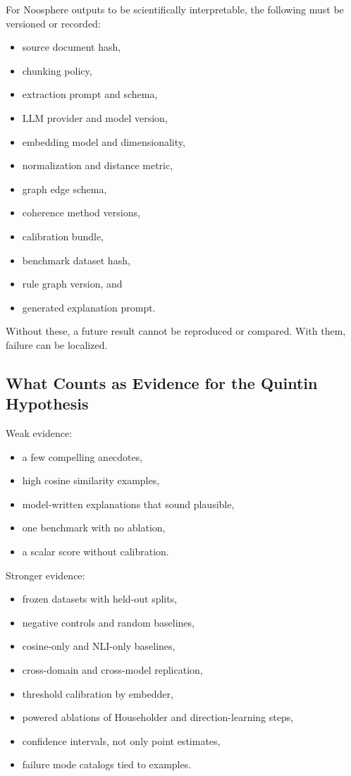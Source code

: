 \documentclass[11pt]{article}
\begin{document}
For Noosphere outputs to be scientifically interpretable, the following must be
versioned or recorded:

\begin{itemize}
\item source document hash,
\item chunking policy,
\item extraction prompt and schema,
\item LLM provider and model version,
\item embedding model and dimensionality,
\item normalization and distance metric,
\item graph edge schema,
\item coherence method versions,
\item calibration bundle,
\item benchmark dataset hash,
\item rule graph version, and
\item generated explanation prompt.
\end{itemize}

Without these, a future result cannot be reproduced or compared. With them,
failure can be localized.

\subsection{What Counts as Evidence for the Quintin Hypothesis}

Weak evidence:

\begin{itemize}
\item a few compelling anecdotes,
\item high cosine similarity examples,
\item model-written explanations that sound plausible,
\item one benchmark with no ablation,
\item a scalar score without calibration.
\end{itemize}

Stronger evidence:

\begin{itemize}
\item frozen datasets with held-out splits,
\item negative controls and random baselines,
\item cosine-only and NLI-only baselines,
\item cross-domain and cross-model replication,
\item threshold calibration by embedder,
\item powered ablations of Householder and direction-learning steps,
\item confidence intervals, not only point estimates,
\item failure mode catalogs tied to examples.
\end{itemize}
\end{document}
